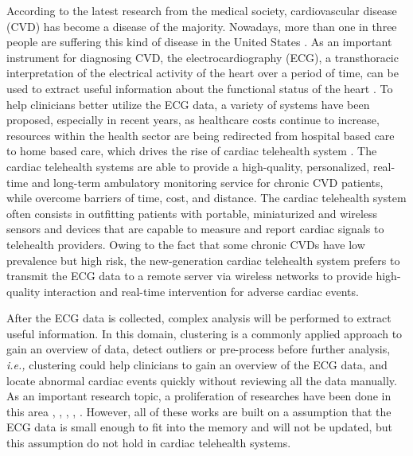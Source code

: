 \documentclass[conference]{IEEEtran}
\begin{document}
According to the latest research from the medical society, cardiovascular disease (CVD) has become a disease of the majority. Nowadays, more than one in three people are suffering this kind of disease in the United States \cite{Roger15122011}. As an important instrument for diagnosing CVD, the electrocardiography (ECG), a transthoracic interpretation of the electrical activity of the heart over a period of time, can be used to extract useful information about the functional status of the heart \cite{springerlink:10.1007/978-3-642-15020-3_21}. To help clinicians better utilize the ECG data, a variety of systems have been proposed, especially in recent years, as healthcare costs continue to increase, resources within the health sector are being redirected from hospital based care to home based care, which drives the rise of cardiac telehealth system \cite{demiris2010role}. The cardiac telehealth systems are able to provide a high-quality, personalized, real-time and long-term ambulatory monitoring service for chronic CVD patients, while overcome barriers of time, cost, and distance. The cardiac telehealth system often consists in outfitting patients with portable, miniaturized and wireless sensors and devices that are capable to measure and report cardiac signals to telehealth providers. Owing to the fact that some chronic CVDs have low prevalence but high risk, the new-generation cardiac telehealth system prefers to transmit the ECG data to a remote server via wireless networks to provide high-quality interaction and real-time intervention for adverse cardiac events. 


After the ECG data is collected, complex analysis will be performed to extract useful information. In this domain, clustering is a commonly applied approach to gain an overview of data, detect outliers or pre-process before further analysis, \textit{i.e.,} clustering could help clinicians to gain an overview of the ECG data, and locate abnormal cardiac events quickly without reviewing all the data manually. As an important research topic, a proliferation of researches have been done in this area \cite{lagerholm2000clustering}, \cite{sufi2011clustering}, \cite{ceylan2009novel}, \cite{bortolan1991ecg}, \cite{bortolan1993diagnostic}. However, all of these works are built on a assumption that the ECG data is small enough to fit into the memory and will not be updated, but this assumption do not hold in cardiac telehealth systems.
\end{document}
